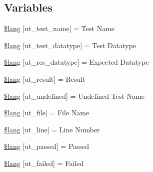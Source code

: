 \subsection*{Variables}
\begin{DoxyCompactItemize}
\item 
\hyperlink{system_2language_2english_2unit__test__lang_8php_ad25baa7cab208cbe1fbe6f6913b0e18c}{\$lang} \mbox{[}\textquotesingle{}ut\+\_\+test\+\_\+name\textquotesingle{}\mbox{]} = \textquotesingle{}Test Name\textquotesingle{}
\item 
\hyperlink{system_2language_2english_2unit__test__lang_8php_a141cfe44ef46b61362f161bc0cf220bc}{\$lang} \mbox{[}\textquotesingle{}ut\+\_\+test\+\_\+datatype\textquotesingle{}\mbox{]} = \textquotesingle{}Test Datatype\textquotesingle{}
\item 
\hyperlink{system_2language_2english_2unit__test__lang_8php_a104083e98991c97a0ffa647a05541146}{\$lang} \mbox{[}\textquotesingle{}ut\+\_\+res\+\_\+datatype\textquotesingle{}\mbox{]} = \textquotesingle{}Expected Datatype\textquotesingle{}
\item 
\hyperlink{system_2language_2english_2unit__test__lang_8php_a01f12785712ee32a97dc53d85e226993}{\$lang} \mbox{[}\textquotesingle{}ut\+\_\+result\textquotesingle{}\mbox{]} = \textquotesingle{}Result\textquotesingle{}
\item 
\hyperlink{system_2language_2english_2unit__test__lang_8php_a08d38874ed86b9368f126d7597801077}{\$lang} \mbox{[}\textquotesingle{}ut\+\_\+undefined\textquotesingle{}\mbox{]} = \textquotesingle{}Undefined Test Name\textquotesingle{}
\item 
\hyperlink{system_2language_2english_2unit__test__lang_8php_aadb1d48c93ccef9a1f4e61d529f8ee80}{\$lang} \mbox{[}\textquotesingle{}ut\+\_\+file\textquotesingle{}\mbox{]} = \textquotesingle{}File Name\textquotesingle{}
\item 
\hyperlink{system_2language_2english_2unit__test__lang_8php_aee353ee43b856ce5ec790a20ea15ef92}{\$lang} \mbox{[}\textquotesingle{}ut\+\_\+line\textquotesingle{}\mbox{]} = \textquotesingle{}Line Number\textquotesingle{}
\item 
\hyperlink{system_2language_2english_2unit__test__lang_8php_a7b1c16415de1186d294aa317d0bc864f}{\$lang} \mbox{[}\textquotesingle{}ut\+\_\+passed\textquotesingle{}\mbox{]} = \textquotesingle{}Passed\textquotesingle{}
\item 
\hyperlink{system_2language_2english_2unit__test__lang_8php_a3aefecf7c98bec69d7957cbb673a3f49}{\$lang} \mbox{[}\textquotesingle{}ut\+\_\+failed\textquotesingle{}\mbox{]} = \textquotesingle{}Failed\textquotesingle{}

\end{DoxyCompactItemize}
